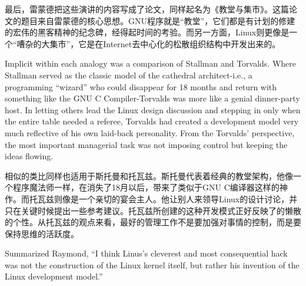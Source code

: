 \ifdefined\chs
最后，雷蒙德把这些演讲的内容写成了论文，同样起名为《教堂与集市》。这篇论文的题目来自雷蒙德的核心思想。GNU程序就是``教堂''，它们都是有计划的修建的宏伟的黑客精神的纪念碑，经得起时间的考验。而另一方面，Linux则更像是一个``嘈杂的大集市''，它是在Internet去中心化的松散组织结构中开发出来的。
\fi



\ifdefined\eng
Implicit within each analogy was a comparison of Stallman and Torvalds. Where Stallman served as the classic model of the cathedral architect-i.e., a programming ``wizard'' who could disappear for 18 months and return with something like the GNU C Compiler-Torvalds was more like a genial dinner-party host. In letting others lead the Linux design discussion and stepping in only when the entire table needed a referee, Torvalds had created a development model very much reflective of his own laid-back personality. From the Torvalds' perspective, the most important managerial task was not imposing control but keeping the ideas flowing.
\fi

\ifdefined\chs
相似的类比同样也适用于斯托曼和托瓦兹。斯托曼代表着经典的教堂架构，他像一个程序魔法师一样，在消失了18月以后，带来了类似于GNU C编译器这样的神作。而托瓦兹则像是一个亲切的宴会主人。他让别人来领导Linux的设计讨论，并只在关键时候提出一些参考建议。托瓦兹所创建的这种开发模式正好反映了的懒散的个性。从托瓦兹的观点来看，最好的管理工作不是要加强对事情的控制，而是要保持思维的活跃度。
\fi

\ifdefined\eng
Summarized Raymond, ``I think Linus's cleverest and most consequential hack was not the construction of the Linux kernel itself, but rather his invention of the Linux development model.''
\fi

